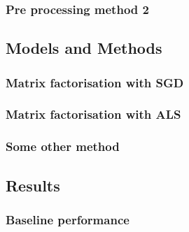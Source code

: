 \documentclass[10pt,conference,compsocconf]{IEEEtran}
\begin{document}
\subsubsection{Pre processing method 2}


\subsection{Models and Methods}
\subsubsection{Matrix factorisation with SGD}
\subsubsection{Matrix factorisation with ALS}
\subsubsection{Some other method}


\subsection{Results}
\subsubsection{Baseline performance}
\end{document}
